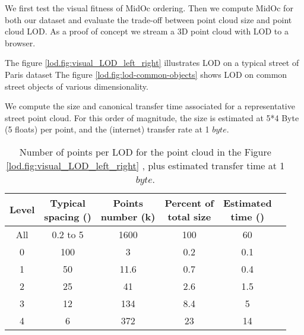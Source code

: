 		
		We first test the visual fitness of MidOc ordering.
		Then we compute MidOc for both our dataset and evaluate the trade-off between point cloud size and point cloud LOD. 
		As a proof of concept we stream a 3D point cloud with LOD to a browser.
		
		The figure \ref{lod.fig:visual_LOD_left_right} illustrates LOD on a typical street of Paris dataset
		The figure \ref{lod.fig:lod-common-objects} shows LOD on common street objects of various dimensionality.
			  
		We compute the size and canonical transfer time associated for a representative street point cloud.
		For this order of magnitude, the size is estimated at 5*4 Byte (5 floats) per point, and the (internet) transfer rate at 1 \mega $byte$\per \second.
		
		\begin{table}[ht]
			\centering
			\caption{Number of points per LOD for the point cloud in the Figure \ref{lod.fig:visual_LOD_left_right}
				, plus estimated transfer time at 1 \mega $byte$\per \second.}
			\label{lod.tab:lod-size-time}
			\scriptsize 
			\begin{tabular}{cccccc}
				\bf{Level} & \shortstack{\bf{Typical} \\ \bf{spacing (\centi \meter)}} & \shortstack{ \bf{Points} \\ \bf{number (k)}} & \shortstack{\bf{Percent of} \\ \bf{total size}} & \shortstack{\bf{Estimated} \\ \bf{time (\second)}}   \\
				\hline All & 0.2 to 5  & 1600 & 100 & 60 \\ 
				\hline 0 & 100 & 3 & 0.2 & 0.1 \\ 
				\hline 1 & 50 & 11.6 & 0.7 & 0.4 \\ 
				\hline 2 & 25 & 41 & 2.6 & 1.5 \\ 
				\hline 3 & 12 & 134 & 8.4 & 5 \\ 
				\hline 4 & 6 & 372 & 23 & 14 \\    
			\end{tabular} 
		\end{table}
			 
